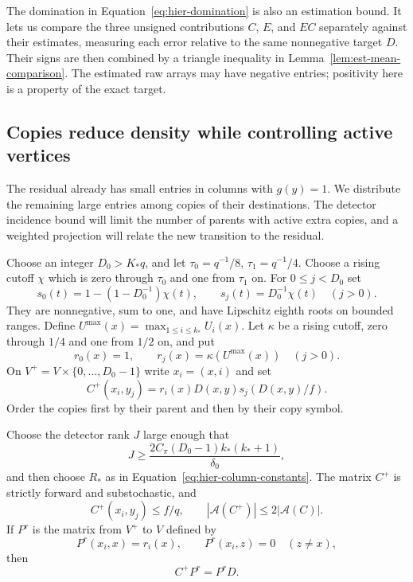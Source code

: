 The domination in Equation~\eqref{eq:hier-domination} is also an
estimation bound.  It lets us compare the three unsigned contributions
$C$, $E$, and $EC$ separately against their estimates, measuring each
error relative to the same nonnegative target $D$.  Their signs are
then combined by a triangle inequality in
Lemma~\ref{lem:est-mean-comparison}.  The estimated raw arrays may have
negative entries; positivity here is a property of the exact target.

\subsection{Copies reduce density while controlling active vertices}

The residual already has small entries in columns with $g(y)=1$.
We distribute the remaining large entries among copies of their
destinations.  The detector incidence bound will limit the number of
parents with active extra copies, and a weighted projection will relate
the new transition to the residual.

Choose an integer $D_0>K_*q$, and let
$\tau_0=q^{-1}/8$, $\tau_1=q^{-1}/4$.
Choose a rising cutoff $\chi$ which is zero through $\tau_0$ and one
from $\tau_1$ on.  For $0\leq j<D_0$ set
\begin{equation}
 s_0(t)=1-(1-D_0^{-1})\chi(t),\qquad
 s_j(t)=D_0^{-1}\chi(t)\quad(j>0).
 \label{eq:hier-routing-fractions}
\end{equation}
They are nonnegative, sum to one, and have Lipschitz eighth roots on
bounded ranges.  Define $U^{\max}(x)=\max_{1\leq i\leq k_*}U_i(x)$.
Let $\kappa$ be a rising cutoff, zero through $1/4$ and one from
$1/2$ on, and put
\begin{equation}
 r_0(x)=1,\qquad r_j(x)=\kappa(U^{\max}(x))\quad(j>0).
 \label{eq:hier-copy-row-factors}
\end{equation}
On $V^+=V\times\{0,\ldots,D_0-1\}$ write $x_i=(x,i)$ and set
\begin{equation}
 C^+(x_i,y_j)=r_i(x)D(x,y)s_j(D(x,y)/f).
 \label{eq:hier-copy-transition}
\end{equation}
Order the copies first by their parent and then by their copy symbol.

\begin{proposition}
\label{prop:hier-copy-step}
Choose the detector rank $J$ large enough that
\begin{equation}
 J\geq\frac{2C_\pi(D_0-1)k_*(k_*+1)}{\delta_0},
 \label{eq:hier-active-J}
\end{equation}
and then choose $R_*$ as in Equation~\eqref{eq:hier-column-constants}.
The matrix $C^+$ is strictly forward and substochastic, and
\[
 C^+(x_i,y_j)\leq f/q,
 \qquad |\mathcal A(C^+)|\leq2|\mathcal A(C)|.
\]
If $P^r$ is the matrix from $V^+$ to $V$ defined by
\begin{equation}
 P^r(x_i,x)=r_i(x),\qquad
 P^r(x_i,z)=0\quad(z\ne x),
 \label{eq:hier-projection}
\end{equation}
then
\begin{equation}
 C^+P^r=P^rD.
 \label{eq:hier-one-step-intertwining}
\end{equation}
\end{proposition}

